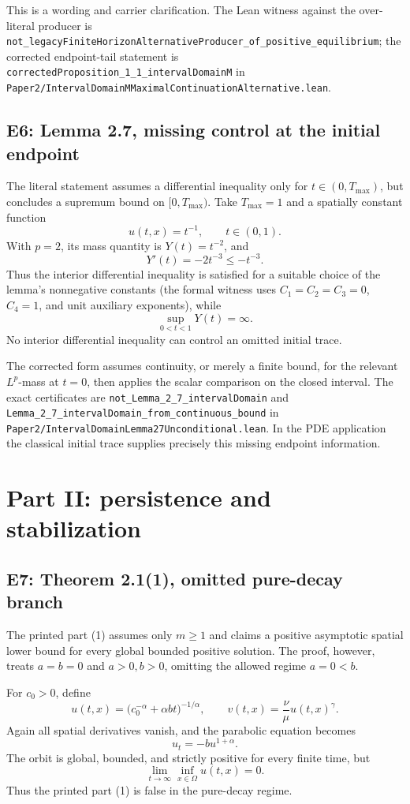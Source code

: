 \documentclass[11pt]{article}
\newcommand{\Om}{\Omega}
\newcommand{\Tmax}{T_{\max}}
\newcommand{\code}[1]{\nolinkurl{#1}}
\begin{document}
This is a wording and carrier clarification.  The Lean witness against the
over-literal producer is
\code{not_legacyFiniteHorizonAlternativeProducer_of_positive_equilibrium};
the corrected endpoint-tail statement is
\code{correctedProposition_1_1_intervalDomainM} in
\code{Paper2/IntervalDomainMMaximalContinuationAlternative.lean}.

\subsection{E6: Lemma 2.7, missing control at the initial endpoint}

The literal statement assumes a differential inequality only for
\(t\in(0,\Tmax)\), but concludes a supremum bound on
\([0,\Tmax)\).  Take \(\Tmax=1\) and a spatially constant function
\[
  u(t,x)=t^{-1},\qquad t\in(0,1).
\]
With \(p=2\), its mass quantity is \(Y(t)=t^{-2}\), and
\[
  Y'(t)=-2t^{-3}\le -t^{-3}.
\]
Thus the interior differential inequality is satisfied for a suitable
choice of the lemma's nonnegative constants (the formal witness uses
\(C_1=C_2=C_3=0\), \(C_4=1\), and unit auxiliary exponents), while
\[
  \sup_{0<t<1}Y(t)=\infty.
\]
No interior differential inequality can control an omitted initial trace.

The corrected form assumes continuity, or merely a finite bound, for the
relevant \(L^p\)-mass at \(t=0\), then applies the scalar comparison on the
closed interval.  The exact certificates are
\code{not_Lemma_2_7_intervalDomain} and
\code{Lemma_2_7_intervalDomain_from_continuous_bound} in
\code{Paper2/IntervalDomainLemma27Unconditional.lean}.  In the PDE
application the classical initial trace supplies precisely this missing
endpoint information.

\section{Part II: persistence and stabilization}

\subsection{E7: Theorem 2.1(1), omitted pure-decay branch}

The printed part (1) assumes only \(m\ge1\) and claims a positive asymptotic
spatial lower bound for every global bounded positive solution.  The proof,
however, treats \(a=b=0\) and \(a>0,b>0\), omitting the allowed regime
\(a=0<b\).

For \(c_0>0\), define
\[
 u(t,x)=\bigl(c_0^{-\alpha}+\alpha bt\bigr)^{-1/\alpha},
 \qquad
 v(t,x)=\frac{\nu}{\mu}u(t,x)^\gamma.
\]
Again all spatial derivatives vanish, and the parabolic equation becomes
\[
  u_t=-bu^{1+\alpha}.
\]
The orbit is global, bounded, and strictly positive for every finite time,
but
\[
  \lim_{t\to\infty}\inf_{x\in\Om}u(t,x)=0.
\]
Thus the printed part (1) is false in the pure-decay regime.
\end{document}
